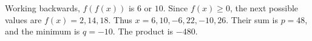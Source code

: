 Working backwards, $f(f(x))$ is $6$ or $10$. Since $f(x)\ge0$, the next possible values are $f(x)=2,14,18$. Thus $x=6,10,-6,22,-10,26$. Their sum is $p=48$, and the minimum is $q=-10$. The product is $\boxed{-480}$.
